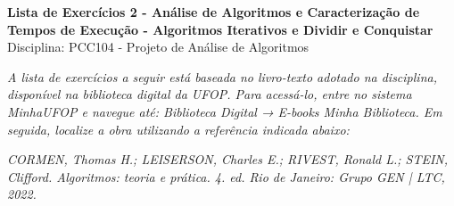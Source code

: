 \documentclass[9pt,a4paper]{extarticle}
\begin{document}
\begin{center}
  \Large \textbf{Lista de Exercícios 2 - Análise de Algoritmos e Caracterização de Tempos de Execução - Algoritmos Iterativos e Dividir e Conquistar} \\[4pt]
  \normalsize Disciplina: PCC104 - Projeto de Análise de Algoritmos
\end{center}

\textit{A lista de exercícios a seguir está baseada no livro-texto adotado na disciplina, disponível na biblioteca digital da UFOP. Para acessá-lo, entre no sistema MinhaUFOP e navegue até: Biblioteca Digital → E-books Minha Biblioteca. Em seguida, localize a obra utilizando a referência indicada abaixo:}

\textit{CORMEN, Thomas H.; LEISERSON, Charles E.; RIVEST, Ronald L.; STEIN, Clifford. Algoritmos: teoria e prática. 4. ed. Rio de Janeiro: Grupo GEN | LTC, 2022.}
\end{document}
